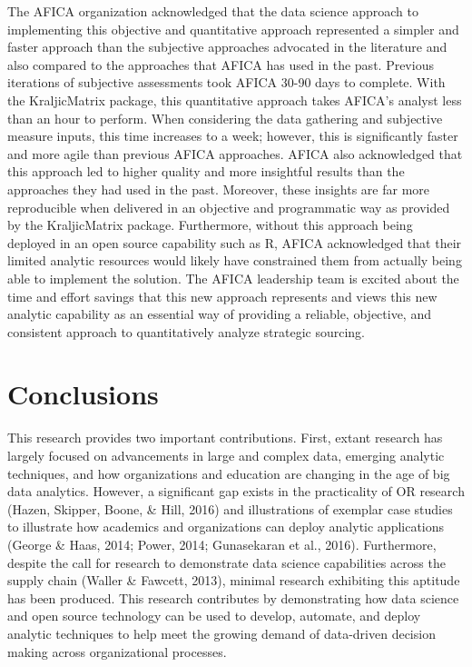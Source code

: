 \documentclass[twocolumn]{svjour3}       %
\begin{document}
The AFICA organization acknowledged that the data science approach to implementing this objective and quantitative approach represented a simpler and faster approach than the subjective approaches advocated in the literature and also compared to the approaches that AFICA has used in the past.  Previous iterations of subjective assessments took AFICA 30-90 days to complete.  With the KraljicMatrix package, this quantitative approach takes AFICA's analyst less than an hour to perform. When considering the data gathering and subjective measure inputs, this time increases to a week; however, this is significantly faster and more agile than previous AFICA approaches. AFICA also acknowledged that this approach led to higher quality and more insightful results than the approaches they had used in the past.  Moreover, these insights are far more reproducible when delivered in an objective and programmatic way as provided by the KraljicMatrix package.  Furthermore, without this approach being deployed in an open source capability such as R, AFICA acknowledged that their limited analytic resources would likely have constrained them from actually being able to implement the solution.  The AFICA leadership team is excited about the time and effort savings that this new approach represents and views this new analytic capability as an essential way of providing a reliable, objective, and consistent approach to quantitatively analyze strategic sourcing.


\section{Conclusions}

This research provides two important contributions. First, extant research has largely focused on advancements in large and complex data, emerging analytic techniques, and how organizations and education are changing in the age of big data analytics.  However, a significant gap exists in the practicality of OR research (Hazen, Skipper, Boone, \& Hill, 2016) and illustrations of exemplar case studies to illustrate how academics and organizations can deploy analytic applications (George \& Haas, 2014; Power, 2014; Gunasekaran et al., 2016).  Furthermore, despite the call for research to demonstrate data science capabilities across the supply chain (Waller \& Fawcett, 2013), minimal research exhibiting this aptitude has been produced.  This research contributes by demonstrating how data science and open source technology can be used to develop, automate, and deploy analytic techniques to help meet the growing demand of data-driven decision making across organizational processes.
\end{document}
